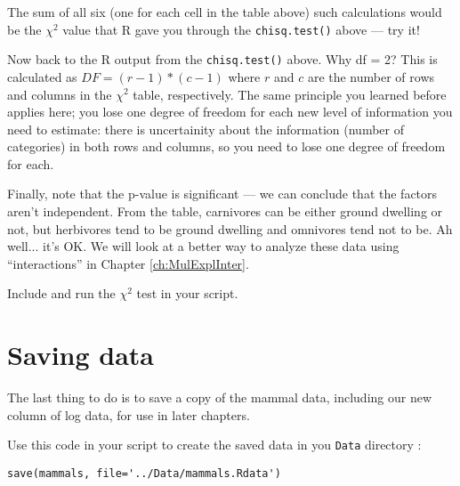 The sum of all six (one for each cell in the table above) such 
calculations would be the $\chi^{2}$ value that R gave you through the 
{\tt chisq.test()} above --- try it!

Now back to the R output from the {\tt chisq.test()} above. Why df = 2? 
This is calculated as $DF = (r - 1) * (c - 1)$ where $r$ and $c$ are 
the number of rows and columns in the $\chi^{2}$ table, respectively. 
The same principle you learned before applies here; you lose one degree 
of freedom for each new level of information you need to estimate: 
there is uncertainity about the information (number of categories) in 
both rows and columns, so you need to lose one degree of freedom for 
each. 

Finally, note that the p-value is significant --- we can conclude that the 
factors aren't independent. From the table, carnivores can be either 
ground dwelling or not, but herbivores tend to be ground dwelling and 
omnivores tend not to be. Ah well... it's OK. We will look at a better 
way to analyze these data using ``interactions'' in Chapter 
\ref{ch:MulExplInter}.

\begin{compactitem}[$\quad\star$]
	\item Include and run the $\chi^2$ test in your script.
\end{compactitem}

\section{Saving data}

The last thing to do is to save a copy of the mammal data, including 
our new column of log data, for use in later chapters. 

\begin{compactitem}[$\quad\star$]
	\item Use this code in your script to create the saved data in you 
	{\tt Data} directory :
\end{compactitem}

\begin{lstlisting}
save(mammals, file='../Data/mammals.Rdata')
\end{lstlisting}	
